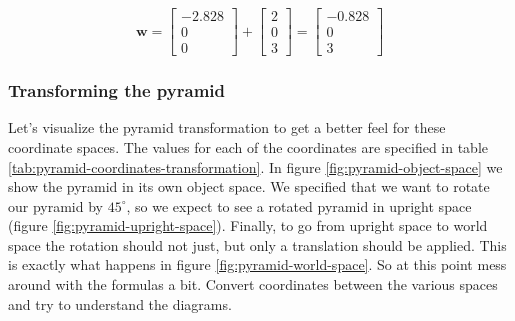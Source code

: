 $$\textbf{w}=\begin{bmatrix}-2.828 \\ 0 \\ 0\end{bmatrix}+\begin{bmatrix}2 \\ 0 \\ 3\end{bmatrix}=\begin{bmatrix}-0.828 \\ 0 \\ 3\end{bmatrix}$$

\subsubsection{Transforming the pyramid}

Let's visualize the pyramid transformation to get a better feel for these coordinate spaces. The values for each of the coordinates are specified in table \ref{tab:pyramid-coordinates-transformation}. In figure \ref{fig:pyramid-object-space} we show the pyramid in its own object space. We specified that we want to rotate our pyramid by $45^\circ$, so we expect to see a rotated pyramid in upright space (figure \ref{fig:pyramid-upright-space}). Finally, to go from upright space to world space the rotation should not just, but only a translation should be applied. This is exactly what happens in figure \ref{fig:pyramid-world-space}. So at this point mess around with the formulas a bit. Convert coordinates between the various spaces and try to understand the diagrams.

